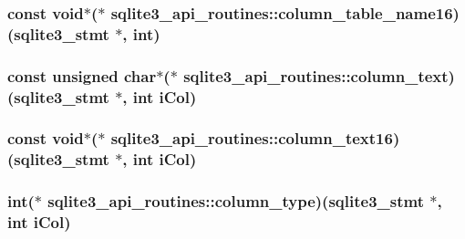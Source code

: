 \hypertarget{structsqlite3__api__routines_af01a003033c1ce2c671e495d35cf00eb}{
\subsubsection[{column\-\_\-table\-\_\-name16}]{\setlength{\rightskip}{0pt plus 5cm}const void$\ast$($\ast$ sqlite3\-\_\-api\-\_\-routines\-::column\-\_\-table\-\_\-name16)({\bf sqlite3\-\_\-stmt} $\ast$, int)}}\label{structsqlite3__api__routines_af01a003033c1ce2c671e495d35cf00eb}
\hypertarget{structsqlite3__api__routines_a958266b11061644abc6a542b30c0dded}{
\subsubsection[{column\-\_\-text}]{\setlength{\rightskip}{0pt plus 5cm}const unsigned char$\ast$($\ast$ sqlite3\-\_\-api\-\_\-routines\-::column\-\_\-text)({\bf sqlite3\-\_\-stmt} $\ast$, int i\-Col)}}\label{structsqlite3__api__routines_a958266b11061644abc6a542b30c0dded}
\hypertarget{structsqlite3__api__routines_a1e92761b9b7068a45dcb576229d1995a}{
\subsubsection[{column\-\_\-text16}]{\setlength{\rightskip}{0pt plus 5cm}const void$\ast$($\ast$ sqlite3\-\_\-api\-\_\-routines\-::column\-\_\-text16)({\bf sqlite3\-\_\-stmt} $\ast$, int i\-Col)}}\label{structsqlite3__api__routines_a1e92761b9b7068a45dcb576229d1995a}
\hypertarget{structsqlite3__api__routines_a1bfa18703e814caf9b940bd89247fde5}{
\subsubsection[{column\-\_\-type}]{\setlength{\rightskip}{0pt plus 5cm}int($\ast$ sqlite3\-\_\-api\-\_\-routines\-::column\-\_\-type)({\bf sqlite3\-\_\-stmt} $\ast$, int i\-Col)}}\label{structsqlite3__api__routines_a1bfa18703e814caf9b940bd89247fde5}
